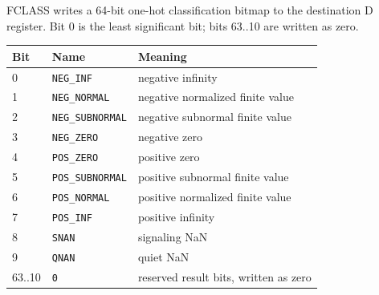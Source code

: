 \begin{manualraggedblock}
FCLASS writes a 64-bit one-hot classification bitmap to the destination D register. Bit 0 is the
least significant bit; bits 63..10 are written as zero.
\par\smallskip
\begingroup\footnotesize
\begin{tabularx}{\linewidth}{@{}p{0.42in}p{1.25in}X@{}}
\toprule
\textbf{Bit} & \textbf{Name} & \textbf{Meaning}\\
\midrule
0 & \texttt{NEG\_INF} & negative infinity\\
1 & \texttt{NEG\_NORMAL} & negative normalized finite value\\
2 & \texttt{NEG\_SUBNORMAL} & negative subnormal finite value\\
3 & \texttt{NEG\_ZERO} & negative zero\\
4 & \texttt{POS\_ZERO} & positive zero\\
5 & \texttt{POS\_SUBNORMAL} & positive subnormal finite value\\
6 & \texttt{POS\_NORMAL} & positive normalized finite value\\
7 & \texttt{POS\_INF} & positive infinity\\
8 & \texttt{SNAN} & signaling NaN\\
9 & \texttt{QNAN} & quiet NaN\\
63..10 & \texttt{0} & reserved result bits, written as zero\\
\bottomrule
\end{tabularx}
\endgroup
\end{manualraggedblock}

